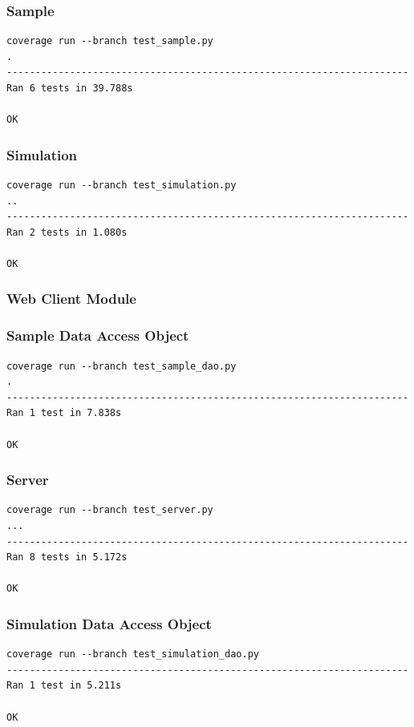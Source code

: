 \documentclass[a4paper,11pt]{article}
\begin{document}
\begin{appendices}
\subsubsection*{Sample}
\begin{verbatim}
coverage run --branch test_sample.py
.
----------------------------------------------------------------------
Ran 6 tests in 39.788s

OK
\end{verbatim}

\subsubsection*{Simulation}
\begin{verbatim}
coverage run --branch test_simulation.py
..
----------------------------------------------------------------------
Ran 2 tests in 1.080s

OK
\end{verbatim}

\subsubsection{Web Client Module}
\subsubsection*{Sample Data Access Object}
\begin{verbatim}
coverage run --branch test_sample_dao.py 
.
----------------------------------------------------------------------
Ran 1 test in 7.838s

OK
\end{verbatim}

\subsubsection*{Server}
\begin{verbatim}
coverage run --branch test_server.py
...
----------------------------------------------------------------------
Ran 8 tests in 5.172s

OK
\end{verbatim}

\subsubsection*{Simulation Data Access Object}
\begin{verbatim}
coverage run --branch test_simulation_dao.py
----------------------------------------------------------------------
Ran 1 test in 5.211s

OK
\end{verbatim}

\end{appendices}
\end{document}
